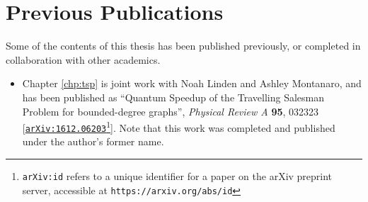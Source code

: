 \chapter*{Previous Publications}

Some of the contents of this thesis has been published previously, or completed in collaboration with other academics.

\begin{itemize}
\item Chapter \ref{chp:tsp} is joint work with Noah Linden and Ashley Montanaro, and has been published as ``Quantum Speedup of the Travelling Salesman Problem for bounded-degree graphs'', \textit{Physical Review A} \textbf{95}, 032323 [{\tt \href{https://arxiv.org/abs/1612.06203}{arXiv:1612.06203}}\footnote{{\tt arXiv:id} refers to a unique identifier for a paper on the arXiv preprint server, accessible at {\tt https://arxiv.org/abs/id}}]. Note that this work was completed and published under the author's former name.
\end{itemize}
